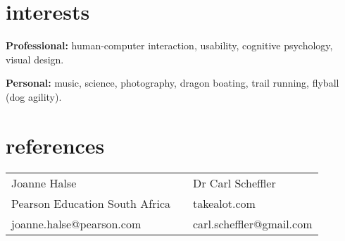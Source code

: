 \documentclass[]{friggeri-cv} %
\begin{document}
\section{interests}

\textbf{Professional:} human-computer interaction, usability, cognitive psychology, visual design.

\textbf{Personal:} music, science, photography, dragon boating, trail running, flyball (dog agility).


\section{references}

\begin{table}[h]
\begin{tabular}{lll}
 Joanne Halse  &  \hspace{3em}  & Dr Carl Scheffler \\
Pearson Education South Africa &    & takealot.com\\
joanne.halse@pearson.com &    & carl.scheffler@gmail.com \\
\end{tabular}
\end{table}
\end{document}
